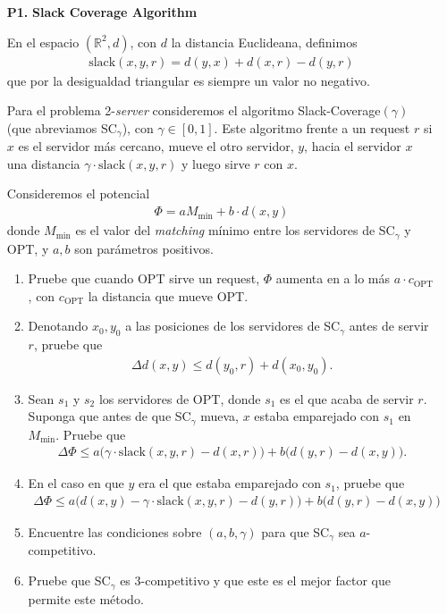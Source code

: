\documentclass[11pt, spanish]{article}
\theoremstyle{plain}
\newcommand{\R}{\mathds{R}}
\newcommand{\SL}{\text{slack}}
\begin{document}
\begin{itemize}
  \item[\textbf{P1.}] \textbf{Slack Coverage Algorithm}
  
  

	  En el espacio $(\R^2,d)$, con $d$ la distancia Euclideana, definimos
	  \begin{align*}
		 \SL(x,y,r) = d(y,x) + d(x,r) - d(y,r) 
	  \end{align*}
	  que por la desigualdad triangular es siempre un valor no negativo.

	  Para el problema 2-\textit{server} consideremos el algoritmo
	  Slack-Coverage$(\gamma)$ (que abreviamos SC$_\gamma$), con
	  $\gamma\in [0,1]$. Este algoritmo frente a un request $r$
	  si $x$ es el servidor más cercano, mueve el otro servidor, $y$,
	  hacia el servidor $x$ una distancia $\gamma\cdot \SL(x,y,r)$ y luego
	  sirve $r$ con $x$.

	  Consideremos el potencial
	  \begin{align*}
		  \Phi = a M_{\min} + b\cdot d(x,y)
	  \end{align*}
	  donde $M_{\min}$ es el valor del \textit{matching} mínimo
	  entre los servidores de SC$_{\gamma}$ y OPT, y $a,b$ son 
	  parámetros positivos.

	  \begin{enumerate}
		  \item Pruebe que cuando OPT sirve un request, $\Phi$ 
			  aumenta en a lo más $a\cdot c_{\text{OPT}}$, con
			  $c_{\text{OPT}}$ la distancia que mueve OPT.
		  \item Denotando $x_0, y_0$ a las posiciones de los 
			  servidores de SC$_\gamma$ antes de servir $r$,
			  pruebe que
			  \begin{align*}
				  \Delta d(x,y) \leq d(y_0,r) + d(x_0,y_0).
			  \end{align*}
		  \item Sean $s_1$ y $s_2$ los servidores de OPT, donde $s_1$ es
			  el que acaba de servir $r$. Suponga que antes de que SC$_{\gamma}$
			  mueva, $x$ estaba emparejado con $s_1$ en $M_{\min}$.
			  Pruebe que
			  \begin{align*}
				  \Delta \Phi\leq a\big( \gamma\cdot \SL(x,y,r)-d(x,r) \big)
				  +b \big( d(y,r) - d(x,y) \big).
			  \end{align*}
		  \item En el caso en que $y$ era el que estaba emparejado con $s_1$, pruebe
			  que
			  \begin{align*}
				  \Delta \Phi \leq a\big( d(x,y) - \gamma \cdot\SL(x,y,r) - d(y,r) \big)
				  + b\big( d(y,r) - d(x,y) \big)
			  \end{align*}
		  \item Encuentre las condiciones sobre $(a,b,\gamma)$ para que 
			  SC$_{\gamma}$ sea $a$-competitivo.
		  \item Pruebe que SC$_{\gamma}$ es 3-competitivo y que este es
			  el mejor factor que permite este m\'etodo.
	  \end{enumerate}

    
    
\end{itemize}
\end{document}
